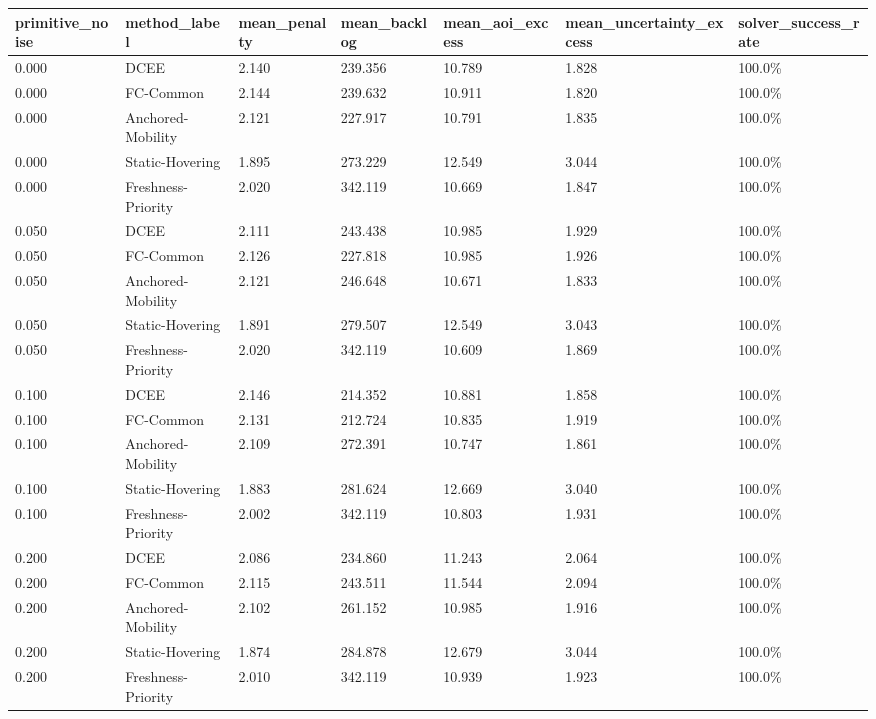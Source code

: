 \begin{tabular}{lllllll}
\toprule
primitive_noise & method_label & mean_penalty & mean_backlog & mean_aoi_excess & mean_uncertainty_excess & solver_success_rate \\
\midrule
0.000 & DCEE & 2.140 & 239.356 & 10.789 & 1.828 & 100.0\% \\
0.000 & FC-Common & 2.144 & 239.632 & 10.911 & 1.820 & 100.0\% \\
0.000 & Anchored-Mobility & 2.121 & 227.917 & 10.791 & 1.835 & 100.0\% \\
0.000 & Static-Hovering & 1.895 & 273.229 & 12.549 & 3.044 & 100.0\% \\
0.000 & Freshness-Priority & 2.020 & 342.119 & 10.669 & 1.847 & 100.0\% \\
0.050 & DCEE & 2.111 & 243.438 & 10.985 & 1.929 & 100.0\% \\
0.050 & FC-Common & 2.126 & 227.818 & 10.985 & 1.926 & 100.0\% \\
0.050 & Anchored-Mobility & 2.121 & 246.648 & 10.671 & 1.833 & 100.0\% \\
0.050 & Static-Hovering & 1.891 & 279.507 & 12.549 & 3.043 & 100.0\% \\
0.050 & Freshness-Priority & 2.020 & 342.119 & 10.609 & 1.869 & 100.0\% \\
0.100 & DCEE & 2.146 & 214.352 & 10.881 & 1.858 & 100.0\% \\
0.100 & FC-Common & 2.131 & 212.724 & 10.835 & 1.919 & 100.0\% \\
0.100 & Anchored-Mobility & 2.109 & 272.391 & 10.747 & 1.861 & 100.0\% \\
0.100 & Static-Hovering & 1.883 & 281.624 & 12.669 & 3.040 & 100.0\% \\
0.100 & Freshness-Priority & 2.002 & 342.119 & 10.803 & 1.931 & 100.0\% \\
0.200 & DCEE & 2.086 & 234.860 & 11.243 & 2.064 & 100.0\% \\
0.200 & FC-Common & 2.115 & 243.511 & 11.544 & 2.094 & 100.0\% \\
0.200 & Anchored-Mobility & 2.102 & 261.152 & 10.985 & 1.916 & 100.0\% \\
0.200 & Static-Hovering & 1.874 & 284.878 & 12.679 & 3.044 & 100.0\% \\
0.200 & Freshness-Priority & 2.010 & 342.119 & 10.939 & 1.923 & 100.0\% \\
\bottomrule
\end{tabular}
